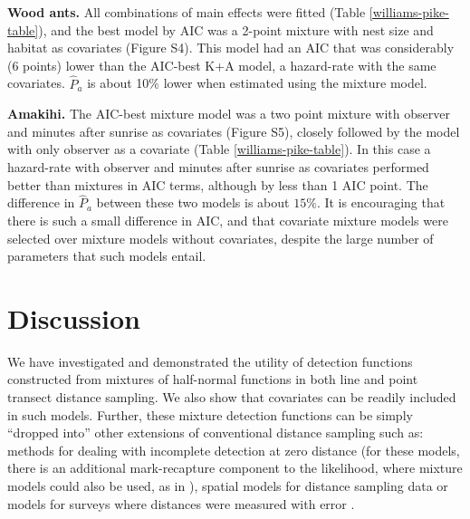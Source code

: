 \documentclass[10pt]{article}
\begin{document}
\textbf{Wood ants.} All combinations of main effects were fitted (Table \ref{williams-pike-table}), and the best model by AIC was a 2-point mixture with nest size and habitat as covariates (Figure S4). This model had an AIC that was considerably (6 points) lower than the AIC-best K+A model, a hazard-rate with the same covariates.  $\hat{P}_a$ is about 10\% lower when estimated using the mixture model.

\textbf{Amakihi.} The AIC-best mixture model was a two point mixture with observer and minutes after sunrise as covariates (Figure S5), closely followed by the model with only observer as a covariate (Table \ref{williams-pike-table}). In this case a hazard-rate with observer and minutes after sunrise as covariates performed better than mixtures in AIC terms, although by less than 1 AIC point. The difference in $\hat{P}_a$ between these two models is about $15\%$.  It is encouraging that there is such a small difference in AIC, and that covariate mixture models were selected over mixture models without covariates, despite the large number of parameters that such models entail.


\section*{Discussion}

We have investigated and demonstrated the utility of detection functions constructed from mixtures of half-normal functions in both line and point transect distance sampling. We also show that covariates can be readily included in such models. Further, these mixture detection functions can be simply ``dropped into'' other extensions of conventional distance sampling such as: methods for dealing with incomplete detection at zero distance \cite{Laake:2004tz, Laake:2011vm} (for these models, there is an additional mark-recapture component to the likelihood, where mixture models could also be used, as in \cite{Pledger:2000tc, Dorazio:2003uf, Pledger:2005wy, Morgan:2008wy}), spatial models for distance sampling data \cite{Hedley:2004et, Miller:2013us} or models for surveys where distances were measured with error \cite{Borchers:2010bq}.
\end{document}
